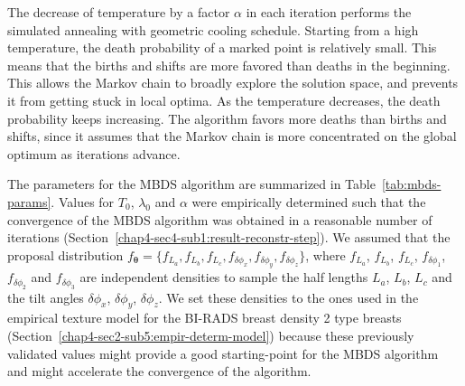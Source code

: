\documentclass[journal]{IEEEtran}
\begin{document}
\setcounter{table}{0}

The decrease of temperature by a factor $\alpha$ in each iteration
performs the simulated annealing \cite{kirkpatrick1983optimization}
with geometric cooling schedule. Starting from a high temperature, the
death probability of a marked point is relatively small. This means
that the births and shifts are more favored than deaths in the
beginning. This allows the Markov chain to broadly explore the
solution space, and prevents it from getting stuck in local optima. As
the temperature decreases, the death probability keeps increasing. The
algorithm favors more deaths than births and shifts, since it assumes
that the Markov chain is more concentrated on the global optimum as
iterations advance.

The parameters for the MBDS algorithm are summarized in
Table~\ref{tab:mbds-params}. Values for $T_0$, $\lambda_0$ and
$\alpha$ were empirically determined such that the convergence of the
MBDS algorithm was obtained in a reasonable number of iterations
(Section~\ref{chap4-sec4-sub1:result-reconstr-step}). We assumed that
the proposal distribution
$f_{\boldsymbol{\theta}} = \{ f_{L_a}, f_{L_b}, f_{L_c},
f_{\delta{\phi_x}}, f_{\delta{\phi_y}}, f_{\delta{\phi_z}} \}$, where
$f_{L_a}$, $f_{L_b}$, $f_{L_c}$, $f_{\delta{\phi_1}}$,
$f_{\delta{\phi_2}}$ and $f_{\delta{\phi_3}}$ are independent
densities to sample the half lengths $L_a$, $L_b$, $L_c$ and the tilt
angles $\delta{\phi_x}$, $\delta{\phi_y}$, $\delta{\phi_z}$.  We set
these densities to the ones used in the empirical texture model for
the BI-RADS breast density 2 type breasts
(Section~\ref{chap4-sec2-sub5:empir-determ-model}) because these
previously validated values might provide a good starting-point for
the MBDS algorithm and might accelerate the convergence of the
algorithm.
\end{document}
